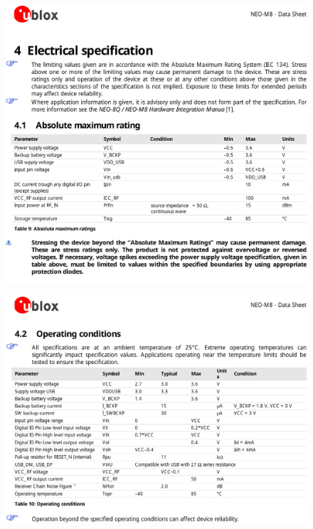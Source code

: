 \begin{figure}[H]
\centering
\includegraphics[width=\textwidth]{gps_2.pdf}
\end{figure}

\newpage
\begin{figure}[H]
\centering
\includegraphics[width=\textwidth]{gps_3.pdf}
\end{figure}

